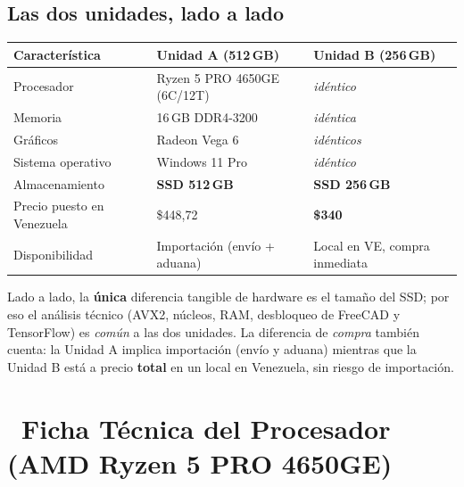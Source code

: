 \documentclass[11pt,a4paper]{article}
\newcommand{\iconotexto}[2]{\textcolor{cyanNeon}{\faIcon{#1}}~#2}
\begin{document}
\subsection{Las dos unidades, lado a lado}

\begin{longtable}{p{3.8cm} p{5.0cm} p{5.2cm}}
\toprule
\textbf{Característica} & \textbf{Unidad A (512\,GB)} & \textbf{Unidad B (256\,GB)} \\
\midrule
\endhead
\bottomrule
\endlastfoot
Procesador & Ryzen 5 PRO 4650GE (6C/12T) & \emph{idéntico} \\
Memoria & 16\,GB DDR4-3200 & \emph{idéntica} \\
Gráficos & Radeon Vega 6 & \emph{idénticos} \\
Sistema operativo & Windows 11 Pro & \emph{idéntico} \\
Almacenamiento & \textbf{SSD 512\,GB} & \textbf{SSD 256\,GB} \\
Precio puesto en Venezuela & \$448{,}72 & \textbf{\$340} \\
Disponibilidad & Importación (envío + aduana) & Local en VE, compra inmediata \\
\bottomrule
\end{longtable}

\begin{cajaConcepto}
Lado a lado, la \textbf{única} diferencia tangible de hardware es el tamaño del SSD; por
eso el análisis técnico (AVX2, núcleos, RAM, desbloqueo de FreeCAD y TensorFlow) es
\emph{común} a las dos unidades. La diferencia de \emph{compra} también cuenta: la Unidad A
implica importación (envío y aduana) mientras que la Unidad B está a precio \textbf{total}
en un local en Venezuela, sin riesgo de importación.
\end{cajaConcepto}

\section[Ficha del Procesador]{\iconotexto{microchip}{Ficha Técnica del Procesador (AMD Ryzen 5 PRO 4650GE)}}
\end{document}
